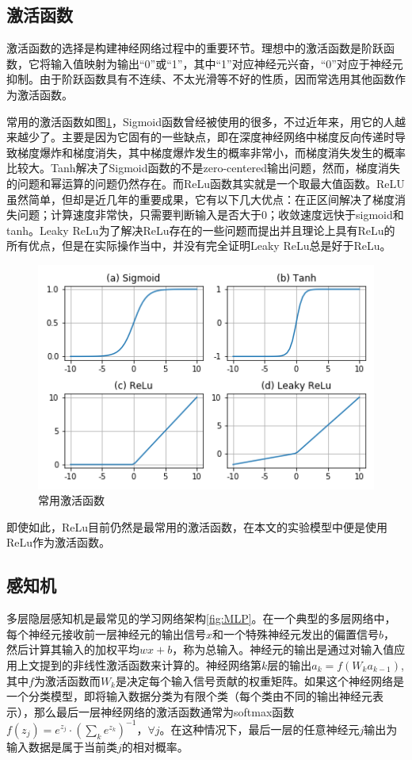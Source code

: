 \documentclass[zihao = -4,cn]{oucart}
\begin{document}
\subsection{激活函数}
激活函数的选择是构建神经网络过程中的重要环节。理想中的激活函数是阶跃函数，它将输入值映射为输出“0”或“1”，其中“1”对应神经元兴奋，“0”对应于神经元抑制。由于阶跃函数具有不连续、不太光滑等不好的性质，因而常选用其他函数作为激活函数。\par
常用的激活函数如图\ref{fig:actfunc}，Sigmoid函数曾经被使用的很多，不过近年来，用它的人越来越少了。主要是因为它固有的一些缺点，即在深度神经网络中梯度反向传递时导致梯度爆炸和梯度消失，其中梯度爆炸发生的概率非常小，而梯度消失发生的概率比较大。Tanh解决了Sigmoid函数的不是zero-centered输出问题，然而，梯度消失的问题和幂运算的问题仍然存在。而ReLu函数其实就是一个取最大值函数。ReLU虽然简单，但却是近几年的重要成果，它有以下几大优点：在正区间解决了梯度消失问题；计算速度非常快，只需要判断输入是否大于0；收敛速度远快于sigmoid和tanh。Leaky ReLu为了解决ReLu存在的一些问题而提出并且理论上具有ReLu的所有优点，但是在实际操作当中，并没有完全证明Leaky ReLu总是好于ReLu。\par
\begin{figure}[h]
	\centering %
	\includegraphics[scale=0.8]{assets/actfunc}
	\caption{常用激活函数}
	\label{fig:actfunc}
\end{figure}
即使如此，ReLu目前仍然是最常用的激活函数，在本文的实验模型中便是使用ReLu作为激活函数。

\subsection{感知机}
多层隐层感知机是最常见的学习网络架构\ref{fig:MLP}。在一个典型的多层网络中，每个神经元接收前一层神经元的输出信号$x$和一个特殊神经元发出的偏置信号$b$，然后计算其输入的加权平均$wx+b$，称为总输入。神经元的输出是通过对输入值应用上文提到的非线性激活函数来计算的。神经网络第$k$层的输出$a_k = f(W_ka_{k-1})$,其中$f$为激活函数而$W_k$是决定每个输入信号贡献的权重矩阵。如果这个神经网络是一个分类模型，即将输入数据分类为有限个类（每个类由不同的输出神经元表示），那么最后一层神经网络的激活函数通常为softmax函数$f(z_j)=e^{z_j}\cdot(\sum_k{e^{z_k}})^{-1}$，$\forall{j}$。在这种情况下，最后一层的任意神经元$j$输出为输入数据是属于当前类$j$的相对概率。\par
\end{document}

